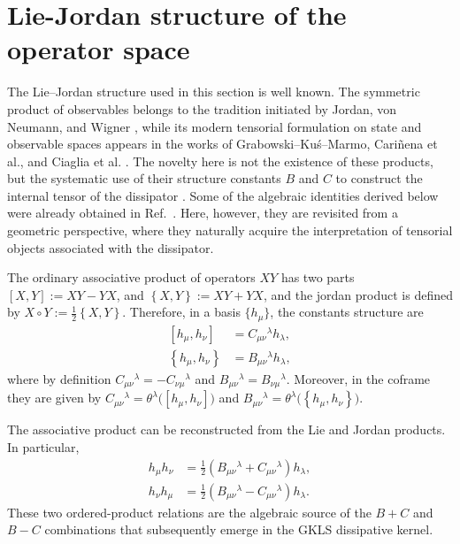 \documentclass[notitlepage,aip,reprint,onecolumn]{revtex4-1}
\theoremstyle{definition}
\renewcommand{\comm}[2]{\left[#1,#2\right]}
\newcommand{\acom}[2]{\left\{#1,#2\right\}}
\newcommand{\circJ}{\mathbin{\circ}}
\begin{document}
\section{Lie-Jordan structure of the operator space}\label{Sec:Lie-Jordan structure of the operators space}
The Lie–Jordan structure used in this section is well known. The symmetric product of observables belongs to the tradition initiated by Jordan, von Neumann, and Wigner \cite{Jordan:1933vh}, while its modern tensorial formulation on state and observable spaces appears in the works of Grabowski–Ku\'s–Marmo, Cariñena et al., and Ciaglia et al. \cite{Grabowski:2005my,Carinena:2009emx,Ciaglia:2017dvs}. The novelty here is not the existence of these products, but the systematic use of their structure constants $B$ and $C$ to construct the internal tensor of the dissipator \cite{Byrd2003,Kimura2005}.
Some of the algebraic identities derived below were already
obtained in Ref.~\cite{Bixano:2026qce}.
Here, however, they are revisited from a geometric perspective,
where they naturally acquire the interpretation of tensorial
objects associated with the dissipator.

The ordinary associative product of operators $XY$ has two parts $\comm{X}{Y}:=XY-YX$, and $ \acom{X}{Y}:=XY+YX$, and the jordan product is defined by \( X\circJ Y:=\frac12\acom{X}{Y}\). Therefore, in a basis $\{h_\mu\}$, the constants structure are
\begin{align}
     \comm{h_\mu}{h_\nu}&=C_{\mu\nu}{}^\lambda h_\lambda,
     \label{eq:C-definition}
     \\
     \acom{h_\mu}{h_\nu}&=B_{\mu\nu}{}^\lambda h_\lambda,
     \label{eq:B-definition}
\end{align}
where by definition \(C_{\mu\nu}{}^\lambda=-C_{\nu\mu}{}^\lambda\) and \(B_{\mu\nu}{}^\lambda=B_{\nu\mu}{}^\lambda\). Moreover, in the coframe they are given by \(C_{\mu\nu}{}^\lambda=\theta^\lambda\big(\comm{h_\mu}{h_\nu}\big)\) and \(B_{\mu\nu}{}^\lambda=\theta^\lambda\big(\acom{h_\mu}{h_\nu}\big)\).

The associative product can be reconstructed from the Lie and Jordan products. In particular,
\begin{subequations}\label{eq:ordered-products-BC}
\begin{align}
    h_\mu h_\nu
    &=
    \frac12
    \left(
    B_{\mu\nu}{}^\lambda
    +
    C_{\mu\nu}{}^\lambda
    \right)h_\lambda,
    \label{eq:hmu-hnu-BC}
    \\
    h_\nu h_\mu
    &=
    \frac12
    \left(
    B_{\mu\nu}{}^\lambda
    -
    C_{\mu\nu}{}^\lambda
    \right)h_\lambda.
    \label{eq:hnu-hmu-BC}
\end{align}
\end{subequations}
These two ordered-product relations are the algebraic source of the \(B+C\) and \(B-C\) combinations that subsequently emerge in the GKLS dissipative kernel.
\end{document}
